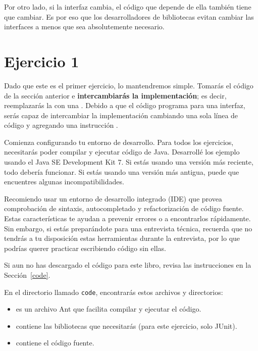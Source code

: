 \documentclass[12pt]{book}
\theoremstyle{exercise}
\begin{document}
Por otro lado, si la interfaz cambia, el código que depende de ella también
tiene que cambiar. Es por eso que los desarrolladores de bibliotecas
evitan cambiar las interfaces a menos que sea absolutemente necesario.


\section{Ejercicio 1}
\label{warming-up}

Dado que este es el primer ejercicio, lo mantendremos simple. Tomarás
el código de la sección anterior e {\bf intercambiarás la implementación};
es decir, reemplazarás la  con una .  
Debido a que el código programa para una interfaz, serás capaz de
intercambiar la implementación cambiando una sola línea de código y
agregando una instrucción .

Comienza configurando tu entorno de desarrollo. Para todos los
ejercicios, necesitarás poder compilar y ejecutar código de Java.
Desarrollé los ejemplo usando el Java SE Development Kit 7.  Si estás
usando una versión más reciente, todo debería funcionar. Si estás
usando una versión más antigua, puede que encuentres algunas
incompatibilidades.


Recomiendo usar un entorno de desarrollo integrado (IDE) que
provea comprobación de sintaxis, autocompletado y refactorización
de código fuente. Estas características te ayudan a prevenir errores o
a encontrarlos rápidamente. Sin embargo, si estás preparándote para
una entrevista técnica, recuerda que no tendrás a tu disposición estas
herramientas durante la entrevista, por lo que podrías querer practicar
escribiendo código sin ellas.

Si aun no has descargado el código para este libro, revisa las
instrucciones en la Sección~\ref{code}.

En el directorio llamado {\tt code}, encontrarás estos archivos y
directorios:

\begin{itemize}
  \item
     es un archivo Ant que facilita compilar y
    ejecutar el código.

  \item
     contiene las bibliotecas que necesitarás (para este
    ejercicio, solo JUnit).

  \item
     contiene el código fuente.

\end{itemize}
\end{document}
